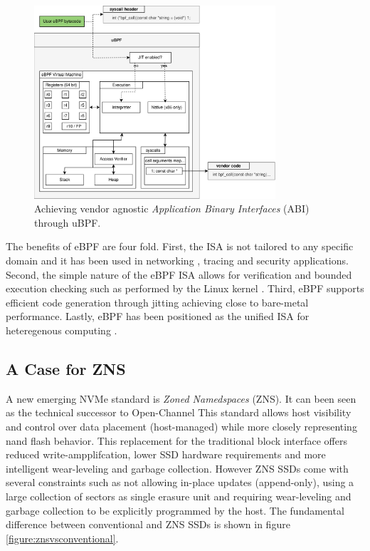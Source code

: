 \begin{figure}
    \centering
	\includegraphics[width=0.8\textwidth]{resources/images/ubpf-abi.pdf}
	\caption{Achieving vendor agnostic \textit{Application Binary Interfaces}
        (ABI) through uBPF.}
    \label{figure:ubpf-abi}
\end{figure}

The benefits of eBPF are four fold. First, the ISA is not tailored to any
specific domain and it has been used in networking \cite{xdp},
tracing \cite{enhanced-ebpf} and security \cite{seccomp} applications. Second,
the simple nature of the eBPF ISA allows for verification and bounded execution
checking such as performed by the Linux kernel \cite{kern-analysis}. Third, eBPF
supports efficient code generation through jitting achieving close to bare-metal
performance. Lastly, eBPF has been positioned as the unified ISA for
heteregenous computing \cite{Brunella2020hXDPES, bpf-uapi}.

\subsection{A Case for ZNS}

A new emerging NVMe standard is \textit{Zoned Namedspaces} (ZNS). It can been
seen as the technical successor to Open-Channel %
This standard allows host visibility and control over data placement
(host-managed) while more closely representing nand flash behavior. This
replacement for the traditional block interface offers reduced
write-ampplifcation, lower SSD hardware requirements and more intelligent
wear-leveling and garbage collection. However ZNS SSDs come with several
constraints such as not allowing in-place updates (append-only), using a large
collection of sectors as single erasure unit and requiring wear-leveling and
garbage collection to be explicitly programmed by the host. The fundamental
difference between conventional and ZNS SSDs is shown in figure
\ref{figure:znsvsconventional}.

